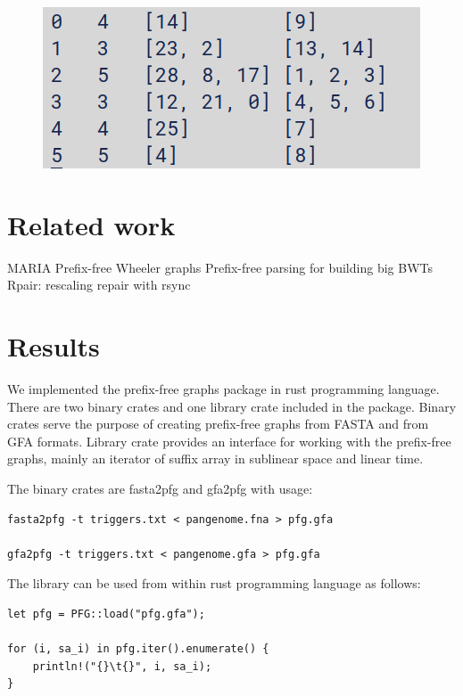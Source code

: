 \documentclass[twocolumn]{ceurart}
\begin{document}
\begin{figure}
    \centering
    \includegraphics[width=\linewidth]{images/segment_metainfo.png}
    \caption{}
    \label{fig:segment_meta}
\end{figure}

\section{Related work}
MARIA \cite{2022maria}
Prefix-free Wheeler graphs \cite{2022pfwg}
Prefix-free parsing for building big BWTs \cite{2019boucher}
Rpair: rescaling repair with rsync \cite{2019gagie}

\section{Results}
We implemented the prefix-free graphs package in rust programming language.
There are two binary crates and one library crate included in the package.
Binary crates serve the purpose of creating prefix-free graphs from FASTA and from GFA formats.
Library crate provides an interface for working with the prefix-free graphs,
mainly an iterator of suffix array in sublinear space and linear time.

The binary crates are fasta2pfg and gfa2pfg with usage:
\begin{verbatim}
fasta2pfg -t triggers.txt < pangenome.fna > pfg.gfa

gfa2pfg -t triggers.txt < pangenome.gfa > pfg.gfa
\end{verbatim}

The library can be used from within rust programming language as follows:

\begin{verbatim}
let pfg = PFG::load("pfg.gfa");

for (i, sa_i) in pfg.iter().enumerate() {
    println!("{}\t{}", i, sa_i);
}
\end{verbatim}
\end{document}
